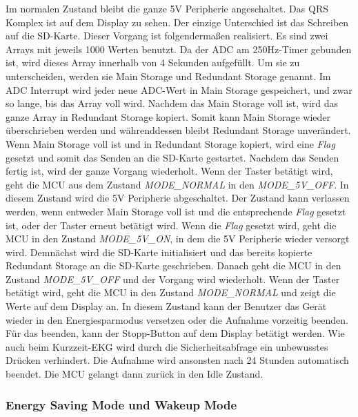 Im normalen Zustand bleibt die ganze 5V Peripherie angeschaltet. Das QRS Komplex ist auf dem Display zu sehen. Der einzige Unterschied ist das Schreiben auf die SD-Karte. Dieser Vorgang ist folgendermaßen realisiert. Es sind zwei Arrays mit jeweils 1000 Werten benutzt. Da der ADC am 250Hz-Timer gebunden ist, wird dieses Array innerhalb von 4 Sekunden aufgefüllt. Um sie zu unterscheiden, werden sie Main Storage und Redundant Storage genannt. Im ADC Interrupt wird jeder neue ADC-Wert in Main Storage gespeichert, und zwar so lange, bis das Array voll wird. Nachdem das Main Storage voll ist, wird das ganze Array in Redundant Storage kopiert. Somit kann Main Storage wieder überschrieben werden und währenddessen bleibt Redundant Storage unverändert. Wenn Main Storage voll ist und in Redundant Storage kopiert, wird eine \textit{Flag} gesetzt und somit das Senden an die SD-Karte gestartet. Nachdem das Senden fertig ist, wird der ganze Vorgang wiederholt.
Wenn der Taster betätigt wird, geht die MCU aus dem Zustand \textit{MODE\_NORMAL} in den \textit{MODE\_5V\_OFF}. In diesem Zustand wird die 5V Peripherie abgeschaltet. Der Zustand kann verlassen werden, wenn entweder Main Storage voll ist und die entsprechende \textit{Flag} gesetzt ist, oder der Taster erneut betätigt wird.
Wenn die \textit{Flag} gesetzt wird, geht die MCU in den Zustand \textit{MODE\_5V\_ON}, in dem die 5V Peripherie wieder versorgt wird. Demnächst wird die SD-Karte initialisiert und das bereits kopierte Redundant Storage an die SD-Karte geschrieben. Danach geht die MCU in den Zustand \textit{MODE\_5V\_OFF} und der Vorgang wird wiederholt.
Wenn der Taster betätigt wird, geht die MCU in den Zustand \textit{MODE\_NORMAL} und zeigt die Werte auf dem Display an. In diesem Zustand kann der Benutzer das Gerät wieder in den Energiesparmodus versetzen oder die Aufnahme vorzeitig beenden. Für das beenden, kann der Stopp-Button auf dem Display betätigt werden. Wie auch beim Kurzzeit-EKG wird durch die Sicherheitsabfrage ein unbewusstes Drücken verhindert. Die Aufnahme wird ansonsten nach 24 Stunden automatisch beendet. Die MCU gelangt dann zurück in den Idle Zustand.

\subsubsection{Energy Saving Mode und Wakeup Mode}

